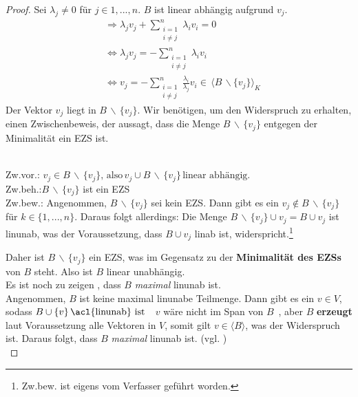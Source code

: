 \begin{proof}
Sei $\lambda_j \not= 0$ für $j \in {1,...,n}$. $B$ ist linear abhängig aufgrund $v_j$. 
\begin{align*}
&\Rightarrow \lambda_j v_j + \sum\limits_{\substack{i=1\\i\not=j}}^{n} \lambda_i v_i = 0
\\ &\Leftrightarrow \lambda_j v_j = - \sum\limits_{\substack{i=1\\i\not=j}}^{n} \lambda_i v_i
\\ &\Leftrightarrow v_j = - \sum\limits_{\substack{i=1\\i\not=j}}^{n} \frac{\lambda_i}{\lambda_j} v_i \in\, \langle B\, \backslash \{v_j\}\rangle_K
\end{align*}
Der Vektor $v_j$ liegt in $B \, \backslash \, \{v_j\}$. Wir benötigen, um den Widerspruch zu erhalten, einen Zwischenbeweis, der aussagt, dass die Menge $B \, \backslash \, \{v_j\}$ entgegen der Minimalität ein \acl{EZS} ist.
\par
\begingroup
\leftskip=2cm
\noindent
\\Zw.vor.: \(v_j \in B \, \backslash \, \{v_j\}\text{, also} \, v_j \cup B \, \backslash \, \{v_j\} \, \text{linear abhängig.} \)
\\Zw.beh.:$B \, \backslash \, \{v_j\}$ ist ein \acl{EZS}
\\Zw.bew.: Angenommen, $B \, \backslash \, \{v_j\}$ sei kein \acl{EZS}. Dann gibt es ein $v_j \notin B \, \backslash \, \{v_j\}$ für $k\in\{1,...,n\}$. Daraus folgt allerdings: Die Menge $B \, \backslash \, \{v_j\} \cup v_j = B \cup {v_j} $ ist \acl{linunab}, was der Voraussetzung, dass $B \cup {v_j}$ \acl{linab} ist, widerspricht.\footnote{Zw.bew. ist eigens vom Verfasser geführt worden.}
\\ 
\par
\endgroup
Daher ist $B \, \backslash \, \{v_j\}$ ein \acl{EZS}, was im Gegensatz zu der \textbf{Minimalität des \acl{EZS}s} von $B$ steht. Also ist $B$ linear unabhängig.
\\Es ist noch zu zeigen , dass $B$ \emph{maximal} \acl{linunab} ist. 
\\Angenommen, $B$ ist keine maximal \acl{linunab}e Teilmenge.
Dann gibt es ein $v \in V$, sodass \( B \cup \{v\}\,\text{\acl{linunab} ist}\)\, \textendash \, $v$ wäre nicht im Span von $B$\, \textendash, aber $B$ \textbf{erzeugt} laut Voraussetzung alle Vektoren in $V$, somit gilt $v \in \langle B \rangle$, was der Widerspruch ist. Daraus folgt, dass $B$ \emph{maximal} \acl{linunab} ist. (vgl. \cite[S. 41, 9.16 (b) $\Rightarrow$ (c)]{Skript})
\\

\end{proof}
